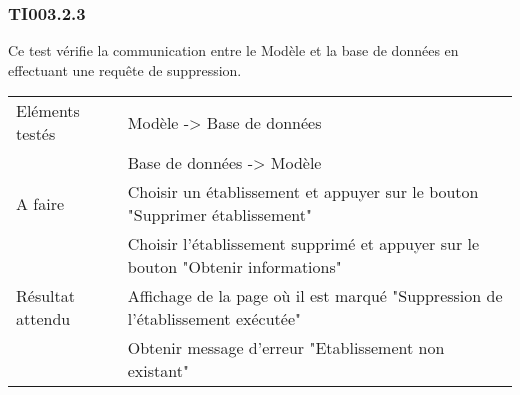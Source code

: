   		
  	\subsubsection{TI003.2.3}
  		Ce test vérifie la communication entre le Modèle et la base de données en effectuant une requête de suppression.
  		\begin{center}
    	 		\begin{tabular}[h]{|p{}|p{}|}
			\hline
				Eléments testés & Modèle -> Base de données  \\
							    &  Base de données -> Modèle \\\hline
    				A faire & Choisir un établissement et appuyer sur le bouton "Supprimer établissement" \\
    						& Choisir l'établissement supprimé et appuyer sur le bouton "Obtenir informations" \\\hline
    				Résultat attendu & Affichage de la page où il est marqué "Suppression de l'établissement exécutée" \\  								 & Obtenir message d'erreur "Etablissement non existant" \\\hline
     		\end{tabular}
  		\end{center}	
  	
  		